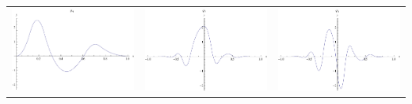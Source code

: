 \documentclass{article}
\begin{document}
\begin{landscape}
\begin{tabular}{ccc}
\includegraphics[width=6.7cm]{quadratic_bspline_4.pdf}& \includegraphics[width=6.7cm]{quadratic_bspline_5.pdf}& \includegraphics[width=6.7cm]{quadratic_bspline_6.pdf} \\
\end{tabular} 
 \end{landscape}
\end{document}
